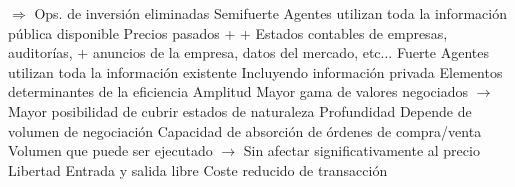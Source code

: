 \documentclass{nuevotema}
\begin{document}
\begin{esquemal}
				\4[] $\Rightarrow$ Ops. de inversión eliminadas
			\3 Semifuerte
				\4 Agentes utilizan toda la información pública disponible
				\4[] Precios pasados +
				\4[] + Estados contables de empresas, auditorías,
				\4[] + anuncios de la empresa, datos del mercado, etc...
			\3 Fuerte
				\4 Agentes utilizan toda la información existente
				\4[] Incluyendo información privada
		\2 Elementos determinantes de la eficiencia
			\3 Amplitud
				\4 Mayor gama de valores negociados
				\4[] $\to$ Mayor posibilidad de cubrir estados de naturaleza
			\3 Profundidad
				\4 Depende de volumen de negociación
				\4 Capacidad de absorción de órdenes de compra/venta
				\4[] Volumen que puede ser ejecutado
				\4[] $\to$ Sin afectar significativamente al precio
			\3 Libertad
				\4 Entrada y salida libre
				\4 Coste reducido de transacción


\end{esquemal}
\end{document}
